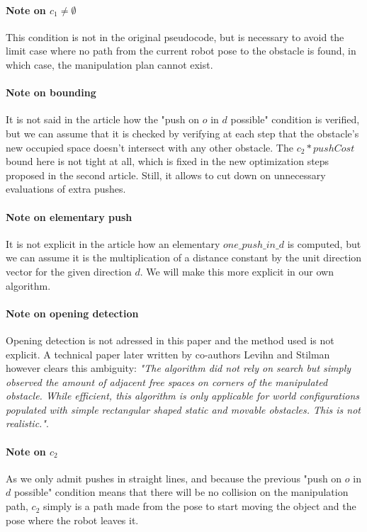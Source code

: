 \paragraph{Note on $c_{1} \neq \emptyset$}\label{c1_note} This condition is not in the original pseudocode, but is necessary to avoid the limit case where no path from the current robot pose to the obstacle is found, in which case, the manipulation plan cannot exist.

\paragraph{Note on bounding}\label{bound_note} It is not said in the article how the "push on $o$ in $d$ possible" condition is verified, but we can assume that it is checked by verifying at each step that the obstacle's new occupied space doesn't intersect with any other obstacle. The $c_{2} * pushCost$ bound here is not tight at all, which is fixed in the new optimization steps proposed in the second article. Still, it allows to cut down on unnecessary evaluations of extra pushes.

\paragraph{Note on elementary push}\label{push_in_d_note} It is not explicit in the article how an elementary $one\_push\_in\_d$ is computed, but we can assume it is the multiplication of a distance constant by the unit direction vector for the given direction $d$. We will make this more explicit in our own algorithm.

\paragraph{Note on opening detection}\label{opening_detection_note} Opening detection is not adressed in this paper and the method used is not explicit. A technical paper later written by co-authors Levihn and Stilman \parencite{levihn_efficient_2011} however clears this ambiguity: \textit{"The algorithm did not rely on search but simply observed the amount of adjacent free spaces on corners of the manipulated obstacle. While efficient, this algorithm is only applicable for world configurations populated with simple rectangular shaped static and movable obstacles. This is not realistic."}.

\paragraph{Note on $c_{2}$}\label{c2_note} As we only admit pushes in straight lines, and because the previous "push on $o$ in $d$ possible" condition means that there will be no collision on the manipulation path, $c_{2}$ simply is a path made from the pose to start moving the object and the pose where the robot leaves it.

